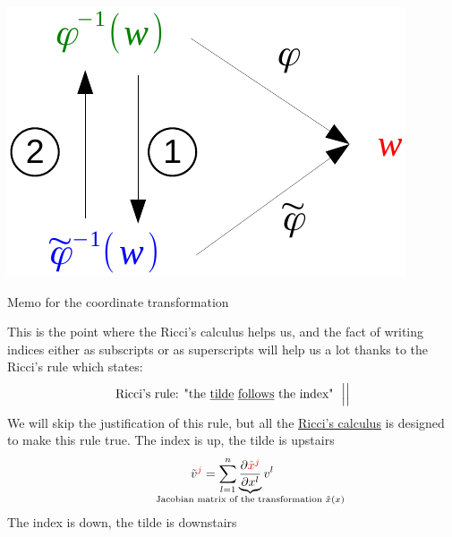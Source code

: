 \documentclass[../main.tex]{subfiles}
\begin{document}
\begin{marginfigure}
	\includegraphics{images/memo_trasf.pdf}
	\caption*{Memo for the coordinate transformation}
\end{marginfigure} 
This is the point where the Ricci's calculus helps us, and the fact of writing indices either as subscripts or as superscripts will help us a lot thanks to the Ricci's rule which states:
\[
\mbox{Ricci's rule:  "the \underline{tilde} \underline{follows} the index"
} \ \Big|\Big|
\]
We will skip the justification of this rule, but all the \href{https://en.wikipedia.org/wiki/Ricci_calculus}{Ricci's calculus} is designed to make this rule true. The index is up, the tilde is upstairs
\[
\tilde{v}^{\textcolor{red}{j}}=\sum_{l=1}^n\underbrace{\frac{\partial\textcolor{red}{\tilde{x}^j}}{\partial x^l}}_{\mathclap{\text{Jacobian matrix of the transformation $\tilde{x}(x)$}}}v^l
\]
The index is down, the tilde is downstairs
\end{document}
